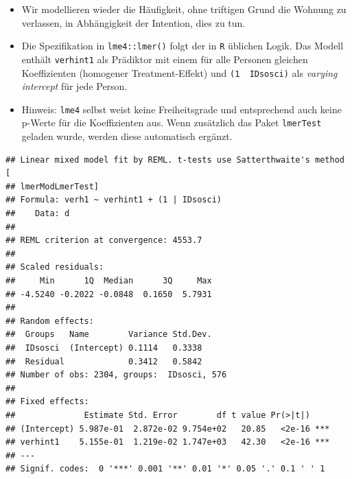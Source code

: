 \documentclass[
]{book}
\newenvironment{Shaded}{\begin{snugshade}}{\end{snugshade}}
\newcommand{\DataTypeTok}[1]{\textcolor[rgb]{0.13,0.29,0.53}{#1}}
\newcommand{\DecValTok}[1]{\textcolor[rgb]{0.00,0.00,0.81}{#1}}
\newcommand{\KeywordTok}[1]{\textcolor[rgb]{0.13,0.29,0.53}{\textbf{#1}}}
\newcommand{\NormalTok}[1]{#1}
\newcommand{\OperatorTok}[1]{\textcolor[rgb]{0.81,0.36,0.00}{\textbf{#1}}}
\newcommand{\OtherTok}[1]{\textcolor[rgb]{0.56,0.35,0.01}{#1}}
\newcommand{\StringTok}[1]{\textcolor[rgb]{0.31,0.60,0.02}{#1}}
\begin{document}
\begin{itemize}
\item
  Wir modellieren wieder die Häufigkeit, ohne triftigen Grund die Wohnung zu verlassen, in Abhängigkeit der Intention, dies zu tun.
\item
  Die Spezifikation in \texttt{lme4::lmer()} folgt der in \texttt{R} üblichen Logik. Das Modell enthält \texttt{verhint1} als Prädiktor mit einem für alle Personen gleichen Koeffizienten (homogener Treatment-Effekt) und \texttt{(1\ \textbar{}~IDsosci)} als \emph{varying intercept} für jede Person.
\item
  Hinweis: \texttt{lme4} selbst weist keine Freiheitsgrade und entsprechend auch keine p-Werte für die Koeffizienten aus. Wenn zusätzlich das Paket \texttt{lmerTest} geladen wurde, werden diese automatisch ergänzt.
\end{itemize}

\begin{Shaded}
\end{Shaded}

\begin{verbatim}
## Linear mixed model fit by REML. t-tests use Satterthwaite's method [
## lmerModLmerTest]
## Formula: verh1 ~ verhint1 + (1 | IDsosci)
##    Data: d
## 
## REML criterion at convergence: 4553.7
## 
## Scaled residuals: 
##     Min      1Q  Median      3Q     Max 
## -4.5240 -0.2022 -0.0848  0.1650  5.7931 
## 
## Random effects:
##  Groups   Name        Variance Std.Dev.
##  IDsosci  (Intercept) 0.1114   0.3338  
##  Residual             0.3412   0.5842  
## Number of obs: 2304, groups:  IDsosci, 576
## 
## Fixed effects:
##              Estimate Std. Error        df t value Pr(>|t|)    
## (Intercept) 5.987e-01  2.872e-02 9.754e+02   20.85   <2e-16 ***
## verhint1    5.155e-01  1.219e-02 1.747e+03   42.30   <2e-16 ***
## ---
## Signif. codes:  0 '***' 0.001 '**' 0.01 '*' 0.05 '.' 0.1 ' ' 1
\end{verbatim}
\end{document}
